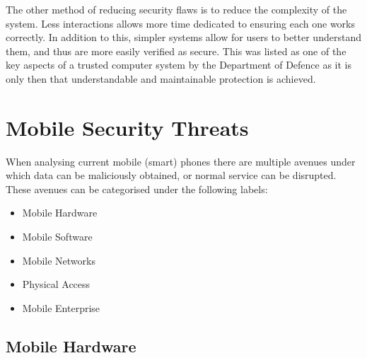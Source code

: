 The other method of reducing security flaws is to reduce the complexity of the system. Less interactions allows more time dedicated to ensuring each one works correctly. In addition to this, simpler systems allow for users to better understand them, and thus are more easily verified as secure. This was listed as one of the key aspects of a trusted computer system by the Department of Defence as it is only then that understandable and maintainable protection is achieved.\cite{Reference10}


\section{Mobile Security Threats}

\label{Ch2 Sec2}

When analysing current mobile (smart) phones there are multiple avenues under which data can be maliciously obtained, or normal service can be disrupted. These avenues can be categorised under the following labels:
\begin{itemize} 
\item Mobile Hardware
\item Mobile Software
\item Mobile Networks
\item Physical Access
\item Mobile Enterprise 
\end{itemize}


\subsection{Mobile Hardware}

\label{Ch2 Sec2 Sub1}

